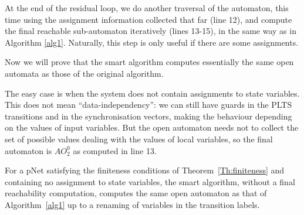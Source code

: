 \documentclass[smallcondensed]{svjour3}
\begin{document}
At the end of the residual loop, we do another traversal of the
automaton, this time using the assignment information collected that
far (line 12), and compute the final reachable sub-automaton
iteratively (lines 13-15), in the same way as in Algorithm \ref{alg1}. 
Naturally, this step is only useful if there are some assignments.

\medskip
Now we will prove that the smart algorithm computes essentially the same 
open automata as those of the original algorithm.

The easy case is when the system does not contain assignments to state
variables. This does not mean ``data-independency'': we can still have
guards in the PLTS transitions and in the synchronisation vectors,
making the behaviour depending on the values of input variables. But
the open automaton needs not to collect the set of possible values dealing
with the values of local variables, so the final automaton is $AO_2^0$ as
computed in line 13.

\begin{theorem}
  \label{Th:CorrectnessWithoutAssignments}
For a pNet satisfying the finiteness conditions of Theorem~\ref{Th:finiteness} and
containing no assignment to state variables, the smart  
algorithm, without a final reachability computation, computes 
the same open automaton as that of Algorithm~\ref{alg1} up to a renaming of
variables in the transition labels.  
  \end{theorem}
\end{document}
